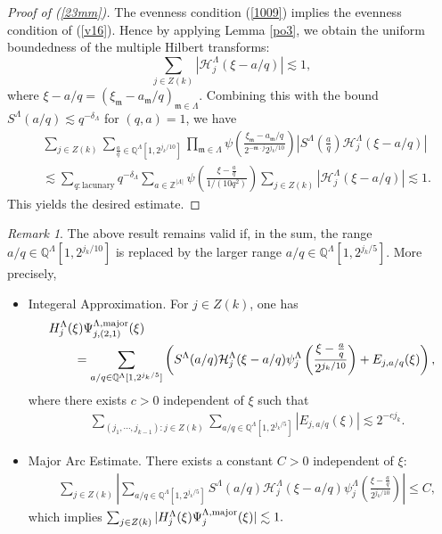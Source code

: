 \documentclass[11 pt,letterpaper]{amsart}
\theoremstyle{plain}
\theoremstyle{definition}
\theoremstyle{remark} \theoremstyle{exam} \theoremstyle{ob}
\newtheorem{remark}{Remark}\numberwithin{remark}{section}
\numberwithin{equation}{section}
\begin{document}
\begin{proof}[Proof of (\ref{23mm})]
The evenness condition (\ref{1009}) implies the evenness condition of (\ref{v16}).
Hence  by applying Lemma \ref{po3},  we obtain the uniform boundedness of the multiple Hilbert transforms:
 $$\sum_{j\in Z(k)}\left|\mathcal{H}^{\Lambda}_{j}\left( \xi-a/q\right)\right|\lesssim 1,$$
where $\xi-a/q=(\xi_{\mathfrak{m}}-a_{\mathfrak{m}}/q)_{\mathfrak{m}\in \Lambda}$.
Combining this with the bound $S^{\Lambda}(a/q)\lesssim q^{-\delta_{\Lambda}}$ for $(q,a)=1$, we   have
 \begin{align*}
 &  \sum_{ j\in Z(k)}\sum_{\frac{a}{q} \in  \mathbb{Q}^{\Lambda}[1,2^{j_k/10}]}\prod_{\mathfrak{m}\in \Lambda } \psi\left(  \frac{  \xi_{\mathfrak{m}}-a_{\mathfrak{m}}/q}{ 2^{-\mathfrak{m}\cdot j}2^{j_k/10}} \right)
 |S^{\Lambda}\left(\frac{a}{q}\right)\mathcal{H}^{\Lambda}_{j}\left(\xi-a/q\right)| \\
&\lesssim  \sum_{q:\text{lacunary}} q^{-\delta_{\Lambda}}\sum_{a\in \mathbb{Z}^{|\Lambda|}}\psi\left(\frac{\xi-\frac{a}{q}}{1/(10q^2)}\right)  
  \sum_{ j\in Z(k)}\left|\mathcal{H}^{\Lambda}_{j}\left(\xi-a/q\right)\right| \lesssim   1. \end{align*}
This yields the desired estimate.
\end{proof}





\begin{remark}\label{yt}
	The above result remains valid if, in the sum, the range
$a/q \in \mathbb{Q}^{\Lambda}[1,2^{j_k/10}]$
	is replaced by the larger range
$a/q \in \mathbb{Q}^{\Lambda}[1,2^{j_k/5}].$ More precisely,
\begin{itemize}
	\item[(1)]  Integeral Approximation.  For $j\in Z(k)$,
	one has
	\begin{align*}
		&H^{\Lambda}_j(\xi) \Psi^{\Lambda,\rm{major}}_{j,(2,1)}(\xi)\nonumber\\
		&\qquad=  \sum_{a/q\in \mathbb{Q}^{\Lambda}[1, 2^{j_k/5}]} \left(S^{\Lambda}(a/q) \mathcal{H}^{\Lambda}_j(\xi-a/q)  \psi_j^{\Lambda}\left( \frac{\xi-\frac{a}{q}}{2^{j_{k}/10}} \right)+E_{j,a/q}(\xi)\right), 
	\end{align*}
	where there exists $c>0$ independent of $\xi$ such that 
	\begin{align*}
		&\sum_{(j_1,\cdots,j_{k-1}):j\in Z(k)}\sum_{a/q\in \mathbb{Q}^{\Lambda}[1, 2^{j_k/5}]}|E_{j,a/q}(\xi)|\lesssim 2^{-cj_k}.
	\end{align*}
	\item[(2)]  Major Arc Estimate.
	There exists a constant $C >0$ independent of $\xi$:
	\begin{align*}
		&\sum_{j\in Z(k) }\left|   \sum_{a/q\in \mathbb{Q}^{\Lambda}[1,2^{j_k/5}]}S^{\Lambda}(a/q)\mathcal{H}_j^{\Lambda}(\xi-a/q) \psi_j^{\Lambda}\left( \frac{\xi-\frac{a}{q}}{2^{j_{k}/10}} \right) \right|
		\le C,
	\end{align*}
	which  implies 
	$
	\sum_{j\in Z(k)} |H^{\Lambda}_j(\xi) \Psi^{\Lambda,\rm{major}}_{j}(\xi)|\lesssim 1.
	$
\end{itemize}
\end{remark}
\end{document}
